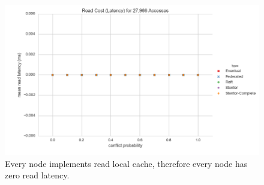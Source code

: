 \documentclass[11pt,letterpaper]{article}
\begin{document}
\begin{figure}[!h]
    \centering
        \includegraphics[width=\textwidth]{figures/read_latency.png}
        \caption{\textsf{Every node implements read local cache, therefore every node has zero read latency.}}
        \label{fig:read_latency}
\end{figure}
\end{document}
